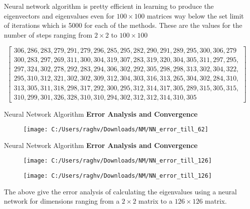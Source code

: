 \documentclass[13.5pt, aspectratio=169]{beamer}
\begin{document}
\begin{frame}
    Neural network algorithm is pretty efficient in learning to produce the eigenvectors and eigenvalues even for $100 \times 100$ matrices way below the set limit of iterations which is 5000 for each of the methods. These are the values for the number of steps ranging from $2 \times 2$ to $100 \times 100$

    \[
        \begin{bmatrix}
            306, 286, 283, 279, 291, 279, 296, 285, 295, 282, 290, 291, 289, 295, 300, 306, 279 \\
            300, 283, 297, 269, 311, 300, 304, 319, 307, 283, 319, 320, 304, 305, 311, 297, 295, \\
            297, 324, 302, 278, 292, 283, 294, 306, 302, 292, 305, 298, 298, 313, 302, 304, 322, \\
            295, 310, 312, 321, 302, 302, 309, 312, 304, 303, 316, 313, 265, 304, 302, 284, 310, \\
            313, 305, 311, 318, 298, 317, 292, 300, 295, 312, 314, 317, 305, 289, 315, 305, 315, \\
            310, 299, 301, 326, 328, 310, 310, 294, 302, 312, 312, 314, 310, 305
        \end{bmatrix}  
    \]
\end{frame}

\begin{frame}{Neural Network Algorithm}
    \large \textbf{Error Analysis and Convergence}

    \begin{figure}[h]
        \centering
        \texttt{[image: C:/Users/raghv/Downloads/NM/NN\_error\_till\_62]}
        \label{fig:image2}
      \end{figure}
\end{frame}

\begin{frame}{Neural Network Algorithm}
    \large \textbf{Error Analysis and Convergence}

    \begin{figure}[h]
        \centering
        \texttt{[image: C:/Users/raghv/Downloads/NM/NN\_error\_till\_126]}
        \label{fig:image2}
      \end{figure}
\end{frame}

\begin{frame}

    \begin{figure}[h]
        \centering
        \texttt{[image: C:/Users/raghv/Downloads/NM/NN\_error\_till\_126]}
        \label{fig:image2}
      \end{figure}

    The above give the error analysis of calculating the eigenvalues using a neural network for dimensions ranging from a $2 \times 2$ matrix to a $126 \times 126$ matrix.
\end{frame}
\end{document}
